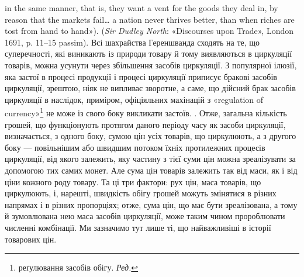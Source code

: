 {in the same manner, that is, they want a vent for the goods they deal in,
by reason that the markets fail\dots{} a nation never thrives better, than when
riches are tost from hand to hand»). (\emph{Sir Dudley North}: «Discourses upon
Trade», London 1691, p. 11--15 passim). Всі шахрайства Гереншванда
сходять на те, що суперечності, які виникають із природи товару й тому
виявляються в циркуляції товарів, можна усунути через збільшення
засобів циркуляції. З популярної ілюзії, яка застої в процесі продукції
і процесі циркуляції приписує бракові засобів циркуляції, зрештою,
ніяк не випливає зворотне, а саме, що дійсний брак засобів циркуляції
в наслідок, приміром, офіціяльних махінацій з «regulation of
currency»\footnote*{
реґулювання засобів обігу. \emph{Ред.}
} не може із свого боку викликати застоїв.
}.
Отже, загальна кількість грошей, що функціонують протягом
даного періоду часу як засоби циркуляції, визначається, з одного
боку, сумою цін усіх товарів, що циркулюють, а з другого боку —
повільнішим або швидшим потоком їхніх протилежних процесів
циркуляції, від якого залежить, яку частину з тієї суми цін можна
зреалізувати за допомогою тих самих монет. Але сума цін товарів
залежить так від маси, як і від ціни кожного роду товару. Та ці
три фактори: рух цін, маса товарів, що циркулюють, і, нарешті,
швидкість обігу грошей можуть змінятися в різних напрямах
і в різних пропорціях; отже, сума цін, що має бути зреалізована,
а тому й зумовлювана нею маса засобів циркуляції, може таким
чином пророблювати численні комбінації. Ми зазначимо тут лише
ті, що найважливіші в історії товарових цін.
